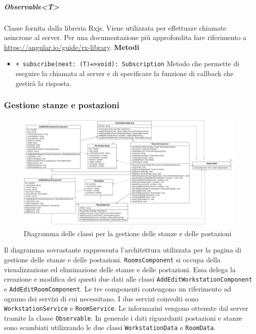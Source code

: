 \subparagraph{Observable<T>}
Classe fornita dalla libreria Rxjs. Viene utilizzata per effettuare chiamate asincrone al server. Per una documentazione più approfondita fare riferimento a \url{https://angular.io/guide/rx-library}. \newline
\textbf{Metodi}
\begin{itemize}
	\item \texttt{+ subscribe(next: (T)=>void): Subscription} \newline
	Metodo che permette di eseguire la chiamata al server e di specificare la funzione di callback che gestirà la risposta.
\end{itemize}

\subsubsection{Gestione stanze e postazioni}
\begin{figure}[H]
	\centering
	\includegraphics[width=18cm]{res/images/webapp-visualAddEditStanzePostazioni-diagrammaClassi.png}
	\caption{Diagramma delle classi per la gestione delle stanze e delle postazioni}
	\label{fig:DiagrammaClassiStanzePostazioni}
\end{figure}
Il diagramma sovrastante rappresenta l'architettura utilizzata per la pagina di gestione delle stanze e delle postazioni. \newline
\texttt{RoomsComponent} si occupa della visualizzazione ed eliminazione delle stanze e delle postazioni. Essa delega la creazione e modifica dei questi due dati alle classi \texttt{AddEditWorkstationComponent} e \texttt{AddEditRoomComponent}. Le tre componenti contengono un riferimento ad ognuno dei servizi di cui necessitano. I due servizi coinvolti sono \texttt{WorkstationService} e \texttt{RoomService}. Le informazini vengono ottenute dal server tramite la classe \texttt{Observable}. In generale i dati riguardanti postazioni e stanze sono scambiati utilizzando le due classi \texttt{WorkstationData} e \texttt{RoomData}.


